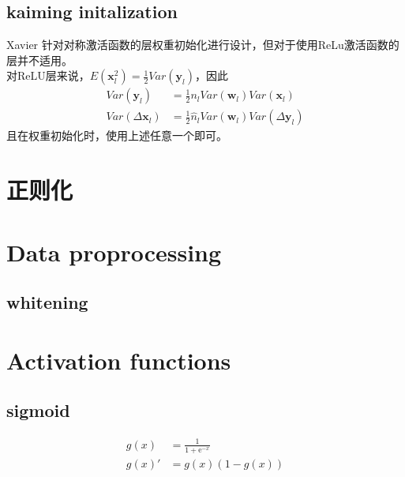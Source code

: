 \subsection{kaiming initalization}
Xavier 针对对称激活函数的层权重初始化进行设计，但对于使用ReLu激活函数的层并不适用。\\
对ReLU层来说，$E(\mathbf{x}_l^2) = \frac{1}{2}Var(\mathbf{y}_l)$，因此
\begin{equation}
    \begin{split}
        Var(\mathbf{y}_l) &= \frac{1}{2} n_l Var(\mathbf{w}_l)Var(\mathbf{x}_l) \\
        Var(\Delta{\mathbf{x}_l}) &= \frac{1}{2} \hat n_l Var(\mathbf{w}_l)Var(\Delta{\mathbf{y}}_l)
    \end{split}
\end{equation}
且在权重初始化时，使用上述任意一个即可。

\section{正则化}

\section{Data proprocessing}
\subsection{whitening}

\section{Activation functions}
\subsection{sigmoid}

\begin{equation}
    \begin{split}
        g(x) &= \frac{1}{1+\mathrm{e}^{-x}} \\
        g(x)' &= g(x)(1-g(x))
    \end{split}
\end{equation}

